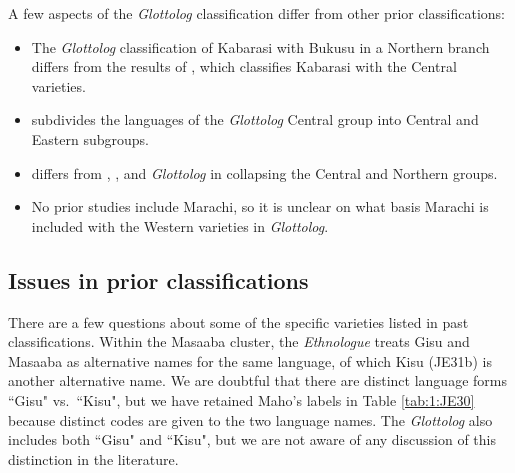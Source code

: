 \documentclass[output=paper]{langscibook}
\begin{document}
A few aspects of the \textit{Glottolog} classification differ from other prior classifications:

\begin{itemize}
    \item The \textit{Glottolog} classification of Kabarasi with Bukusu in a Northern branch differs from the results of \citet{williams_lexico-statistical_1973}, which classifies Kabarasi with the Central varieties.
    
    \item \citet{williams_lexico-statistical_1973} subdivides the languages of the \textit{Glottolog} Central group into Central and Eastern subgroups.
    
    \item \citet{heine_language_1980} differs from \citet{mould_comparative_1976,mould_greater_1981}, \citet{williams_lexico-statistical_1973}, and \textit{Glottolog} in collapsing the Central and Northern groups.
    
    \item  No prior studies include Marachi, so it is unclear on what basis Marachi is included with the Western varieties in \textit{Glottolog}.
    
\end{itemize}



\subsection{Issues in prior classifications}
\label{sec:2.5:Issues_in_prior_classifications}

There are a few questions about some of the specific varieties listed in past classifications. Within the Masaaba cluster, the \textit{Ethnologue} treats Gisu and Masaaba as alternative names for the same language, of which Kisu (JE31b) is another alternative name. We are doubtful that there are distinct language forms ``Gisu" vs.\ ``Kisu", but we have retained Maho's labels in Table \ref{tab:1:JE30} because distinct codes are given to the two language names. The \textit{Glottolog} also includes both ``Gisu" and ``Kisu", but we are not aware of any discussion of this distinction in the literature.
\end{document}
